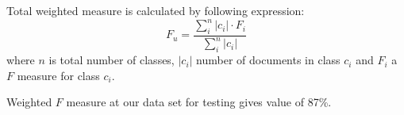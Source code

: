 \documentclass[11pt,english]{article}
\begin{document}
\begin{multicols}{2}

Total weighted measure is calculated by following expression:
\begin{equation}
F_u = \frac{\sum^{n}_i |c_i|\cdot F_i}{\sum^n_i|c_i|}
\end{equation}
where $n$ is total number of classes, $|c_i|$ number of documents in class
$c_i$ and $F_i$ a $F$ measure for class $c_i$.

Weighted $F$ measure at our data set for testing gives value of 87\%.


\end{multicols}
\end{document}

